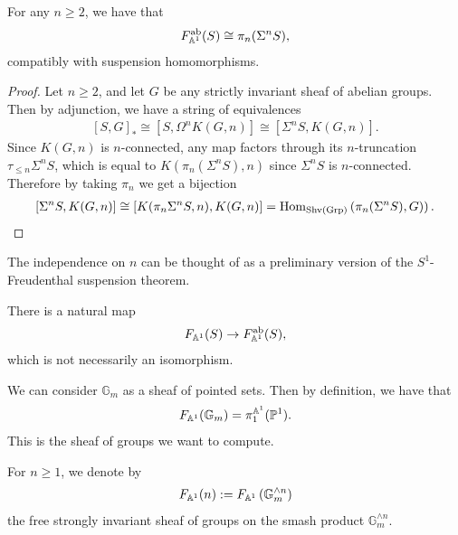 \documentclass[11pt,openany]{book}
\let\smashprod\wedge
\begin{document}
\begin{proposition} For any $n\ge 2$, we have that 
\begin{align*}
    F_{\mathbb{A}^1}^{\mathrm{ab}}(S) \cong \pi_n(\Sigma^n S),
\end{align*}
compatibly with suspension homomorphisms.
\end{proposition}
\begin{proof} Let $n \ge 2$, and let $G$ be any strictly invariant sheaf of abelian groups. Then by adjunction, we have a string of equivalences
\begin{align*}
    \left[ S,G \right]_\ast \cong \left[ S, \Omega^n K(G,n) \right] \cong \left[ \Sigma^n S, K(G,n) \right].
\end{align*}
Since $K(G,n)$ is $n$-connected, any map factors through its $n$-truncation $\tau_{\le n} \Sigma^n S$, which is equal to $K(\pi_n(\Sigma^n S),n)$ since $\Sigma^n S$ is $n$-connected. Therefore by taking $\pi_n$ we get a bijection
\begin{align*}
    \left[ \Sigma^n S, K(G,n) \right] \cong \left[ K(\pi_n \Sigma^n S , n), K(G,n) \right] = \mathrm{Hom}_{\mathrm{Shv}(\mathrm{Grp})} \left( \pi_n(\Sigma^n S), G) \right).
\end{align*}
\end{proof}


The independence on $n$ can be thought of as a preliminary version of the $S^1$-Freudenthal suspension theorem.


\begin{remark} There is a natural map
\begin{align*}
    F_{\mathbb{A}^1}(S) \to F_{\mathbb{A}^1}^{\mathrm{ab}}(S),
\end{align*}
which is not necessarily an isomorphism.
\end{remark}


\begin{example} We can consider $\mathbb{G}_m$ as a sheaf of pointed sets. Then by definition, we have that
\begin{align*}
    F_{\mathbb{A}^1}(\mathbb{G}_m) = \pi_1^{\mathbb{A}^1}(\mathbb{P}^1).
\end{align*}
This is the sheaf of groups we want to compute.
\end{example}

\begin{notation} For $n\ge 1$, we denote by
\begin{align*}
    F_{\A^1}(n) := F_{\A^1} \left( \mathbb{G}_m^{\smashprod n} \right)
\end{align*}
the free strongly invariant sheaf of groups on the smash product $\mathbb{G}_m^{\smashprod n}$.
\end{notation}
\end{document}

